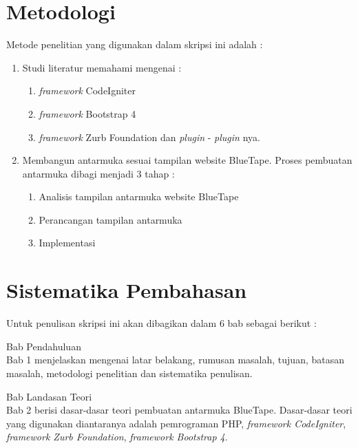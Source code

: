 \section{Metodologi}
\label{sec:metlit}
%
Metode penelitian yang digunakan dalam skripsi ini adalah :
\begin{enumerate}
	\item Studi literatur memahami mengenai :
	\begin{enumerate}
		\item \textit{framework} CodeIgniter
		\item \textit{framework} Bootstrap 4
		\item \textit{framework} Zurb Foundation dan \textit{plugin} - \textit{plugin} nya.
	\end{enumerate}
	\item  Membangun antarmuka sesuai tampilan website BlueTape. Proses pembuatan antarmuka dibagi menjadi 3 tahap :
	\begin{enumerate}
		\item Analisis tampilan antarmuka website BlueTape
		\item Perancangan tampilan antarmuka
		\item Implementasi		
	\end{enumerate}
\end{enumerate}


\section{Sistematika Pembahasan}
\label{sec:sispem}
Untuk penulisan skripsi ini akan dibagikan dalam 6 bab sebagai berikut :
\doublespacing
\begin{singlespace}
\noindent Bab Pendahuluan \\
Bab 1 menjelaskan mengenai latar belakang, rumusan masalah, tujuan, batasan masalah, metodologi penelitian dan sistematika penulisan.
\end{singlespace}

\begin{singlespace}
\noindent Bab Landasan Teori \\
Bab 2 berisi dasar-dasar teori pembuatan antarmuka BlueTape. Dasar-dasar teori yang digunakan diantaranya adalah pemrograman PHP, \textit{framework CodeIgniter}, \textit{framework Zurb Foundation}, \textit{framework Bootstrap 4}.
\end{singlespace}


